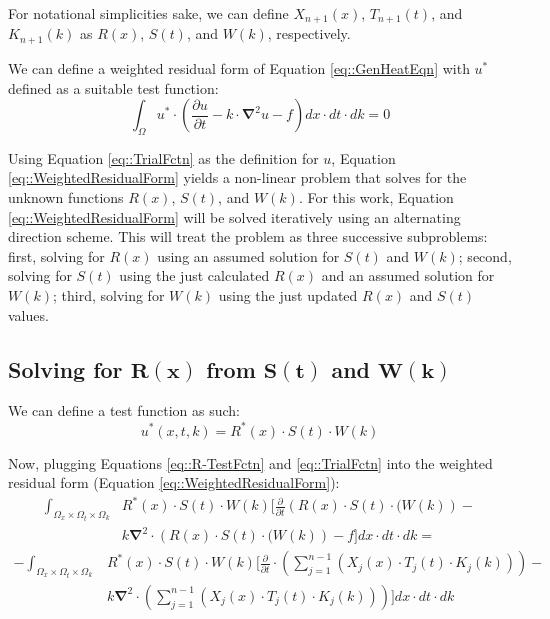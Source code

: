 \documentclass{article}
\def\ds{\displaystyle}
\def\pd{\partial}
\def\grad{\mathbf\nabla}
\begin{document}
For notational simplicities sake, we can define $X_{n+1}(x)$, $T_{n+1}(t)$, and $K_{n+1}(k)$ as $R(x)$, $S(t)$, and $W(k)$, respectively.

We can define a weighted residual form of Equation \ref{eq::GenHeatEqn} with $u^*$ defined as a suitable test function:
\begin{equation}
\label{eq::WeightedResidualForm}
\ds\int_{\Omega} u^* \cdot\left(\frac{\pd u}{\pd t} -k\cdot\grad^2 u -f \right) dx \cdot dt \cdot dk = 0
\end{equation}

Using Equation \ref{eq::TrialFctn} as the definition for $u$, Equation \ref{eq::WeightedResidualForm} yields a non-linear problem that solves for the unknown functions $R(x)$, $S(t)$, and $W(k)$. For this work, Equation \ref{eq::WeightedResidualForm} will be solved iteratively using an alternating direction scheme. This will treat the problem as three successive subproblems: first, solving for $R(x)$ using an assumed solution for $S(t)$ and $W(k)$; second, solving for $S(t)$ using the just calculated $R(x)$ and an assumed solution for $W(k)$; third, solving for $W(k)$ using the just updated $R(x)$ and $S(t)$ values.

\subsection{Solving for $\mathbf{R(x)}$ from $\mathbf{S(t)}$ and $\mathbf{W(k)}$}
We can define a test function as such:
\begin{equation}
\label{eq::R-TestFctn}
u^*(x,t,k) = R^*(x) \cdot S(t) \cdot W(k)
\end{equation}

Now, plugging Equations \ref{eq::R-TestFctn} and \ref{eq::TrialFctn} into the weighted residual form (Equation \ref{eq::WeightedResidualForm}):
\begin{align*}
\ds\int_{\Omega_x \times \Omega_t \times \Omega_k} & R^*(x) \cdot S(t) \cdot W(k) \bigg[ \frac{\pd}{\pd t} \left( R(x) \cdot S(t) \cdot (W(k) \right) - \\
&  k\grad^2 \cdot \left( R(x) \cdot S(t) \cdot (W(k) \right) -f \bigg] dx \cdot dt \cdot dk =
\end{align*}
\begin{align}
\label{eq::R-1}
- \ds\int_{\Omega_x \times \Omega_t \times \Omega_k} & R^*(x) \cdot S(t) \cdot W(k) \Bigg[\frac{\pd}{\pd t} \cdot \left( \ds\sum_{j=1}^{n-1} \left(X_j(x) \cdot T_j(t) \cdot K_j(k)\right)\right) - \nonumber\\
&  k\grad^2 \cdot \left( \ds\sum_{j=1}^{n-1} \left(X_j(x) \cdot T_j(t) \cdot K_j(k)\right) \right)\Bigg] dx \cdot dt \cdot dk
\end{align}
\end{document}
